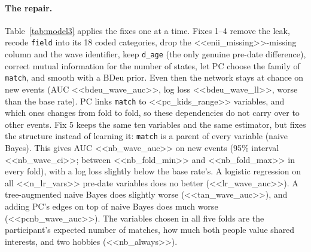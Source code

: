\paragraph{The repair.} Table~\ref{tab:model3} applies the fixes one at a time. Fixes 1--4 remove
the leak, recode \texttt{field} into its 18 coded categories, drop the <<enii_missing>>-missing column and the
wave identifier, keep \texttt{d\_age} (the only genuine pre-date difference), correct mutual
information for the number of states, let PC choose the family of \texttt{match}, and smooth with
a BDeu prior. Even then the network stays at chance on new events (AUC <<bdeu_wave_auc>>, log loss
<<bdeu_wave_ll>>, worse than the base rate). PC links \texttt{match} to <<pc_kids_range>>
variables, and which ones changes from fold to fold, so these dependencies do not carry over to
other events. Fix 5 keeps the same ten variables and the same estimator, but fixes the structure
instead of learning it: \texttt{match} is a parent of every variable (naive Bayes). This gives AUC
<<nb_wave_auc>> on new events (95\% interval <<nb_wave_ci>>; between <<nb_fold_min>> and
<<nb_fold_max>> in every fold), with a log loss slightly below the base rate's. A logistic regression on all
<<n_lr_vars>> pre-date variables does no better (<<lr_wave_auc>>). A tree-augmented naive Bayes
\cite{friedman1997bayesian} does slightly worse (<<tan_wave_auc>>), and adding PC's edges on top of
naive Bayes does much worse (<<pcnb_wave_auc>>). The variables chosen in all five folds are the
participant's expected number of matches, how much both people value shared interests, and two
hobbies (<<nb_always>>).

